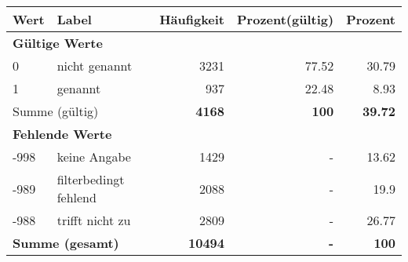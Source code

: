      \begin{longtable}{lXrrr}
     \toprule
     \textbf{Wert} & \textbf{Label} & \textbf{Häufigkeit} & \textbf{Prozent(gültig)} & \textbf{Prozent} \\
     \endhead
     \midrule
     \multicolumn{5}{l}{\textbf{Gültige Werte}}\\

     0 &
     \multicolumn{1}{X}{ nicht genannt   } &


       \num{3231} &
       \num[round-mode=places,round-precision=2]{77.52} &
         \num[round-mode=places,round-precision=2]{30.79} \\

     1 &
     \multicolumn{1}{X}{ genannt   } &


       \num{937} &
       \num[round-mode=places,round-precision=2]{22.48} &
         \num[round-mode=places,round-precision=2]{8.93} \\
     \midrule
     \multicolumn{2}{l}{Summe (gültig)} &
       \textbf{\num{4168}} &
     \textbf{\num{100}} &
       \textbf{\num[round-mode=places,round-precision=2]{39.72}} \\
     \multicolumn{5}{l}{\textbf{Fehlende Werte}}\\
       -998 &
       keine Angabe &
         \num{1429} &
        - &
         \num[round-mode=places,round-precision=2]{13.62} \\
       -989 &
       filterbedingt fehlend &
         \num{2088} &
        - &
         \num[round-mode=places,round-precision=2]{19.9} \\
       -988 &
       trifft nicht zu &
         \num{2809} &
        - &
         \num[round-mode=places,round-precision=2]{26.77} \\
     \midrule
     \multicolumn{2}{l}{\textbf{Summe (gesamt)}} &
          \textbf{\num{10494}} &
        \textbf{-} &
        \textbf{\num{100}} \\
     \bottomrule
     \end{longtable}
     

